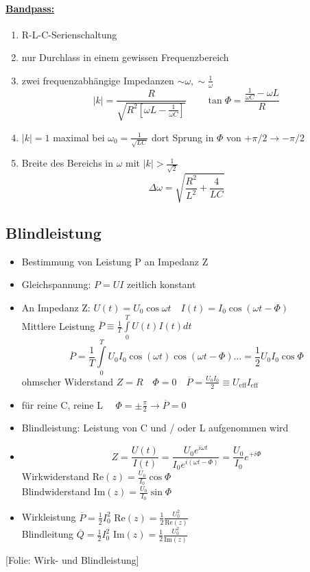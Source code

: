 \documentclass[titlepage,12pt,a4paper,ngerman]{report}
\newcommand{\tx}[1]{\textrm{#1}}
\newcommand{\folie}[1]{\color{gray}[Folie: #1]\color{black}}
\begin{document}
\paragraph{\underline{Bandpass:}}
\begin{enumerate}
	\item R-L-C-Serienschaltung
	\item nur Durchlass in einem gewissen Frequenzbereich
	\item zwei frequenzabhängige Impedanzen $ \sim \omega, \sim \frac{1}{\omega} $\\
	$$|k| = \frac{R}{\sqrt{R^2 [\omega L - \frac{1}{\omega C}]}} \qquad \tan \Phi = \frac{\frac{1}{\omega C} - \omega L}{R} $$
	\item $ |k| = 1 $ maximal bei $ \omega_0 = \frac{1}{\sqrt{LC}} $ dort Sprung in $ \Phi $ von $ + \pi/2 \rightarrow - \pi/2 $
	\item Breite des Bereichs in $ \omega $ mit $ |k| > \frac{1}{\sqrt{2}} $\\
	$$ \Delta \omega = \sqrt{\frac{R^2}{L^2} + \frac{4}{LC}} $$
\end{enumerate}
\subsection{Blindleistung}
\begin{itemize}
	\item Bestimmung von Leistung P an Impedanz Z 
	\item Gleichspannung: $ P = U I $ zeitlich konstant
	\item An Impedanz Z: $ U(t) = U_0 \cos \omega t \quad I(t) = I_0 \cos (\omega t-\Phi) $\\
	Mittlere Leistung $ \overline{P} \equiv \frac{1}{T} \int\limits_{0}^{T} U(t) I(t) dt $\\
	$$ \overline{P} = \frac{1}{T} \int\limits_{0}^{T} U_0 I_0 \cos (\omega t) \cos (\omega t - \Phi) \dots = \frac{1}{2} U_0 I_0 \cos \Phi $$
	ohmscher Widerstand $ Z = R \quad \Phi = 0 \quad \overline{P} = \frac{U_0 I_0}{2} \equiv U_{\tx{eff}} I_{\tx{eff}} $
	\item für reine C, reine L $ \quad \Phi = \pm \frac{\pi}{2} \rightarrow \overline{P} = 0 $
	\item  Blindleistung: Leistung von C und / oder L aufgenommen wird
	
	
	\item $$Z = \frac{U(t)}{I(t)} = \frac{U_0 e^{i\omega t}}{I_0 e ^{i(\omega t - \Phi)}} = \frac{U_0}{I_0} e ^{+i\Phi}$$
	Wirkwiderstand $ \tx{Re} (z) = \frac{U_0}{I_0} \cos \Phi $\\
	Blindwiderstand $ \tx{Im} (z) = \frac{U_0}{I_0} \sin \Phi $
	\item Wirkleistung $ \overline{P} = \frac{1}{2} I_0^2 \tx{ Re}(z) = \frac{1}{2} \frac{U_0^2}{\tx{Re}(z)} $\\
	Blindleitung $ \overline{Q} = \frac{1}{2} I_0^2 \tx{ Im}(z) = \frac{1}{2} \frac{U_0^2}{\tx{Im}(z)} $
\end{itemize}
\folie{Wirk- und Blindleistung}
\end{document}
